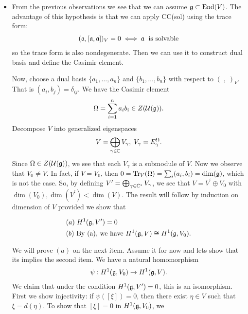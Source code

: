 \begin{itemize}
\item[3.] From the previous observations we see that we can assume $\mathfrak{g}\subset\text{End}(V)$. The advantage of this hypothesis
is that we can apply CC(sol) using the trace form:
\begin{equation}
    (\mathfrak{a},[\mathfrak{a},\mathfrak{a}])_V=0\iff \mathfrak{a}\;\text{ is solvable}
\end{equation}
so the trace form is also nondegenerate. Then we can use it to construct dual basis and define the Casimir element.\par

Now, choose a dual basis $\{a_1,\dots,a_n\}$ and $\{b_1,\dots, b_n\}$ with respect to $(\;,\;)_V$. That is 
$(a_i,b_j)=\delta_{ij}$. We have the Casimir element 
\begin{equation}
    \Omega=\sum_{i=1}^na_ib_i\in Z(\mathcal{U}(\mathfrak{g})).
\end{equation}
Decompose $V$ into generalized eigenspaces 
\begin{equation}
    V = \bigoplus_{\gamma\in\mathbb{C}}V_\gamma,\;V_\gamma= E_{\gamma}^{\Omega}.
\end{equation}
Since $\Omega\in Z(\mathcal{U}(\mathfrak{g}))$, we see that each $V_\gamma$ is a submodule of $V$. Now we observe that 
$V_0\neq V$. In fact, if $V=V_0$, then $0=\text{Tr}_V(\Omega)=\sum_i(a_i,b_i)=\dim(\mathfrak{g})$, which is not the case. So, 
by defining $V^\prime = \bigoplus_{\gamma\in\mathbb{C}^*}V_\gamma$, we see that $V=V^\prime\oplus V_0$ with 
$\dim(V_0),\dim(V^\prime)<\dim(V)$. The result will follow by induction on dimension of $V$ provided we show that 
\begin{dang}
    \begin{equation}
    \begin{aligned}
        &(a)\; H^1(\mathfrak{g},V^\prime)=0\\
        &(b) \text{ By (a), we have } H^1(\mathfrak{g},V)\cong H^1(\mathfrak{g},V_0).
    \end{aligned}
\end{equation}
\end{dang}
We will prove $(a)$ on the next item. Assume it for now and lets show that its implies the second item. We have a 
natural homomorphism
\begin{equation}
    \psi: H^1(\mathfrak{g},V_0)\rightarrow H^1(\mathfrak{g},V).
\end{equation}
We claim that under the condition $H^1(\mathfrak{g},V^\prime)=0$, this is an isomorphism. First we show injectivity: if 
$\psi([\xi])=0$, then there exist $\eta\in V$ such that $\xi=d(\eta)$. To show that $[\xi]=0$ in $H^1(\mathfrak{g},V_0)$, we 

\end{itemize}
